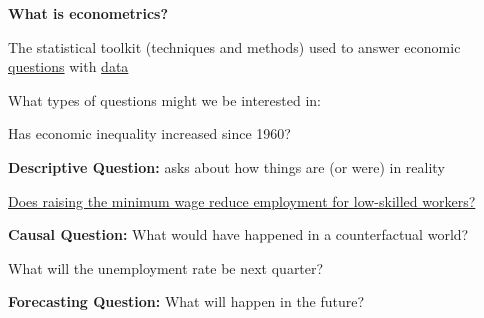 \documentclass[11pt, aspectratio=169]{beamer}
\newenvironment{wideitemize}{\itemize\addtolength{\itemsep}{5pt}}{\enditemize}
\begin{document}
\begin{frame}{\bf \large What is econometrics?}
	
	\vspace{0.2cm}
	The statistical toolkit (techniques and methods) used to answer economic \underline{questions} with \underline{data}
	\bigskip 
	
	\pause
	What types of questions might we be interested in: 
	\medskip
	
	\begin{wideitemize}
		\item<1-> Has economic inequality increased since 1960?
		\begin{wideitemize}
			\item<3-> \textbf{Descriptive Question:} asks about how things are (or were) in reality
		\end{wideitemize}
		\item<1-> \href{http://davidcard.berkeley.edu/papers/njmin-aer.pdf}{Does raising the minimum wage reduce employment for low-skilled workers?}
		\begin{wideitemize}
			\item<4-> \textbf{Causal Question:} What would have happened in a counterfactual world?  
		\end{wideitemize}
		\item<1->   What will the unemployment rate be next quarter?
		\begin{wideitemize}
			\item<5-> \textbf{Forecasting Question:} What will happen in the future?  
		\end{wideitemize}

	\end{wideitemize}
	
\end{frame}
\end{document}
